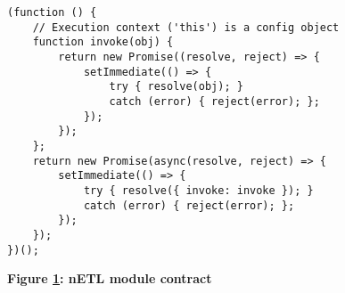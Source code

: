 \begin{figure}[H]
  \centering
  \begin{mdframed}
    \centering
    \begin{verbatim}
(function () {
    // Execution context ('this') is a config object
    function invoke(obj) {
        return new Promise((resolve, reject) => {
            setImmediate(() => {
                try { resolve(obj); }
                catch (error) { reject(error); };
            });
        });
    };
    return new Promise(async(resolve, reject) => {
        setImmediate(() => {
            try { resolve({ invoke: invoke }); }
            catch (error) { reject(error); };
        });
    });
})();
        \end{verbatim}
  \end{mdframed}
  \caption[nETL module contract]{\textbf{Figure \ref{fig-module-contract}: nETL module contract}}
  \label{fig-module-contract}
\end{figure}